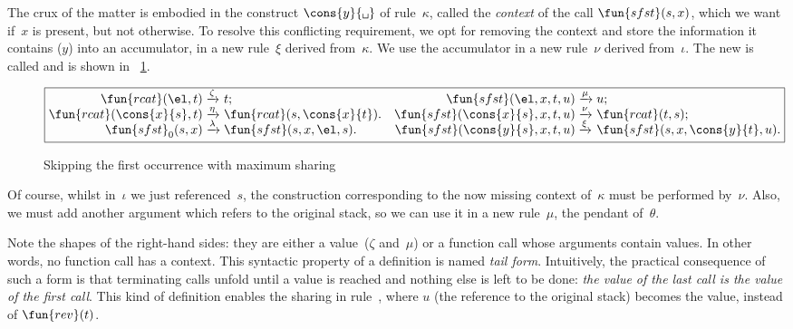 The crux of the matter is embodied in the construct
\(\cons{y}{\texttt{\textvisiblespace}}\) of rule~\(\kappa\), called
the \emph{context} of the
call \(\fun{sfst}(s,x)\), which we want
if~\(x\) is present, but not otherwise. To resolve this conflicting
requirement, we opt for removing the context and store the information
it contains (\(y\)) into an accumulator, in a new rule~\(\xi\) derived
from~\(\kappa\). We use the accumulator in a new rule~\(\nu\) derived
from~\(\iota\). The new  is called
 and is shown in
\fig~\ref{fig:sfst0}.
\begin{figure}[b]
\begin{equation*}
\boxed{%
\begin{array}{@{}r@{\;}l@{\;}lr@{\;}l@{\;}l@{}}
\fun{rcat}(\el,t)              & \xrightarrow{\smash{\zeta}} & t; &
\fun{sfst}(\el,x,t,u)          & \xrightarrow{\smash{\mu}} & u;\\
\fun{rcat}(\cons{x}{s},t)      & \xrightarrow{\smash{\eta}}
                               & \fun{rcat}(s,\cons{x}{t}). &
\fun{sfst}(\cons{x}{s},x,t,u)  & \xrightarrow{\smash{\nu}}
                               & \fun{rcat}(t,s);\\
\fun{sfst}_0(s,x)              & \xrightarrow{\smash{\lambda}}
                               & \fun{sfst}(s,x,\el,s). &
\fun{sfst}(\cons{y}{s},x,t,u)  & \xrightarrow{\smash{\xi}}
                               & \fun{sfst}(s,x,\cons{y}{t},u).
\end{array}}
\end{equation*}
\caption{Skipping the first occurrence with maximum sharing}
\label{fig:sfst0}
\end{figure}
Of course, whilst in~\(\iota\) we just referenced~\(s\), the
construction corresponding to the now missing context of~\(\kappa\)
must be performed by~\(\nu\). Also, we must add another argument which
refers to the original stack, so we can use it in a new rule~\(\mu\),
the pendant of~\(\theta\).

Note the shapes of the right\hyp{}hand sides: they are either a
value~(\(\zeta\) and~\(\mu\)) or a function call whose arguments
contain values. In other words, no function call has a context. This
syntactic property of a definition is named \emph{tail
form}. Intuitively, the practical
consequence of such a form is that terminating calls unfold until a
value is reached and nothing else is left to be done: \emph{the value
of the last call is the value of the first call}. This kind of
definition enables the sharing in rule~\clause{\mu}, where \(u\) (the
reference to the original stack) becomes the value, instead of
\(\fun{rev}(t)\).

